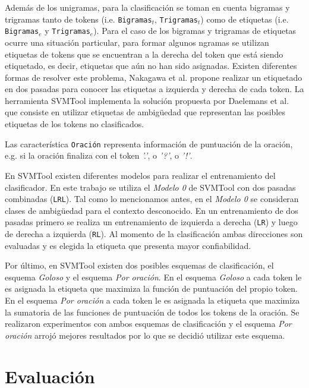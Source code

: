 \documentclass[runningheads,a4paper]{llncs}
\begin{document}
Adem\'as de los unigramas, para la clasificaci\'on se toman en cuenta bigramas y trigramas tanto de tokens (i.e. \texttt{\small Bigramas$_{t}$}, \texttt{\small Trigramas$_{t}$}) como de etiquetas (i.e. \texttt{\small Bigramas$_{e}$} y \texttt{\small Trigramas$_{e}$}). Para el caso de los bigramas y trigramas de etiquetas ocurre una situaci\'on particular, para formar algunos ngramas se utilizan etiquetas de tokens que se encuentran a la derecha del token que está siendo etiquetado, es decir, etiquetas que aún no han sido asignadas. Existen diferentes formas de resolver este problema, Nakagawa et al.\cite{NAKAGAWA01} propone realizar un etiquetado en dos pasadas para conocer las etiquetas a izquierda y derecha de cada token. La herramienta SVMTool implementa la solución propuesta por Daelemans et al.\cite{DAELEMANS96} que consiste en utilizar etiquetas de ambig\"uedad que representan las posibles etiquetas de los tokens no clasificados.

Las caracter\'istica \texttt{\small Oraci\'on} representa información de puntuación de la oración, e.g. si la oración finaliza con el token \emph{'.'}, o \emph{'?'}, o \emph{'!'}.

En SVMTool existen diferentes modelos para realizar el entrenamiento del clasificador. En este trabajo se utiliza el \emph{Modelo 0} de SVMTool con dos pasadas combinadas (\texttt{\small LRL}). Tal como lo mencionamos antes, en el \emph{Modelo 0} se consideran clases de ambig\"uedad para el contexto desconocido. En un entrenamiento de dos pasadas primero se realiza un entrenamiento de izquierda a derecha (\texttt{\small LR}) y luego de derecha a izquierda (\texttt{\small RL}). Al momento de la clasificación ambas direcciones son evaluadas y es elegida la etiqueta que presenta mayor confiabilidad.

Por último, en SVMTool existen dos posibles esquemas de clasificación, el esquema \emph{Goloso} y el esquema \emph{Por oración}. En el esquema \emph{Goloso} a cada token le es asignada la etiqueta que maximiza la función de puntuación del propio token. En el esquema \emph{Por oración} a cada token le es asignada la etiqueta que maximiza la sumatoria de las funciones de puntuación de todos los tokens de la oración. Se realizaron experimentos con ambos esquemas de clasificación y el esquema \emph{Por oración} arrojó mejores resultados por lo que se decidió utilizar este esquema.

\section{Evaluación}
\label{sec:Resultados}
\end{document}
